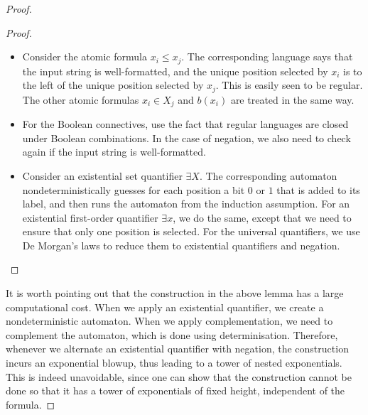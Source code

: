 \begin{proof}
\begin{proof}
        \begin{itemize}
            \item Consider the atomic formula $x_i \leq x_j$. The corresponding language says that the input string is well-formatted, and the unique position selected by $x_i$ is to the left of the unique position selected by $x_j$. This is easily seen to be regular. The other atomic formulas $x_i \in X_j$ and $b(x_i)$ are treated in the same way. 
            \item For the Boolean connectives, use the fact that regular languages are closed under Boolean combinations. In the case of negation, we also need to check  again if  the input string is well-formatted. 
            \item Consider an existential set quantifier $\exists X$. The corresponding automaton nondeterministically guesses for each position a bit $0$ or $1$ that is added to its label, and then runs the automaton from the induction assumption. For an existential first-order quantifier $\exists x$, we do the same, except that we need to ensure that only one position is selected. For the universal quantifiers, we use De Morgan's laws to reduce them to existential quantifiers and negation.\end{itemize} 
    \end{proof}
    It is worth pointing out that the construction in the above lemma has a large computational cost. When we apply an existential quantifier, we create a nondeterministic automaton. When we apply complementation, we need to complement the automaton, which is done using determinisation. Therefore, whenever we alternate an existential quantifier with negation, the construction incurs an exponential blowup, thus leading to a tower of nested exponentials. This is indeed unavoidable, since one can show that the construction cannot be done so that it has a tower of exponentials of fixed height, independent of the formula.
\end{proof}

